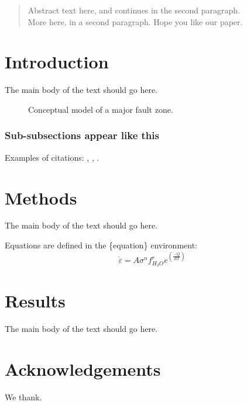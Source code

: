 \documentclass{tektonika}
\begin{document}
\maketitle
\thispagestyle{firststyle}

\begin{abstract}
Abstract text here, and continues in the second paragraph. \\

More here, in a second paragraph. Hope you like our paper. 
\end{abstract}


\section{Introduction}
The main body of the text should go here.
\lipsum[1]

\begin{figure}[h!]\centering
\caption{Conceptual model of a major fault zone.}
\label{fig:1}
\end{figure}

\subsubsection{Sub-subsections appear like this}

Examples of citations: \citep{jordan1981},  \citet{staal2021a}, \citep[discussed by e.g.][]{staal2021a}. 


\section{Methods}
The main body of the text should go here.
\lipsum[1]




Equations are defined in the \{equation\} environment:
 \begin{equation}
\dot{\varepsilon} = A\sigma^{n} f_{H_{2}O}^{r} e^{({\frac{-Q}{RT}})}
\end{equation}

\section{Results}
The main body of the text should go here.
\lipsum[1]



\section*{Acknowledgements} %
We thank.
\end{document}
